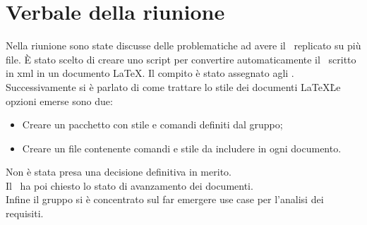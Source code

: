 \documentclass[../Riunione16-01-12.tex]{subfiles}
\begin{document}
\section{Verbale della riunione}
Nella riunione sono state discusse delle problematiche ad avere il \glossario\ replicato su più file. È stato scelto di creare uno script per convertire automaticamente il \glossario\ scritto in xml in un documento \LaTeX . Il compito è stato assegnato agli \amministratori. \\
Successivamente si è parlato di come trattare lo stile dei documenti \LaTeX\. Le opzioni emerse sono due:
	\begin{itemize}
		\item Creare un pacchetto con stile e comandi definiti dal gruppo;
		\item Creare un file contenente comandi e stile da includere in ogni documento.
	\end{itemize}
Non è stata presa una decisione definitiva in merito.\\
Il \responsabilediprogetto\ ha poi chiesto lo stato di avanzamento dei documenti.\\
Infine il gruppo si è concentrato sul far emergere use case per l'analisi dei requisiti.
\end{document}
